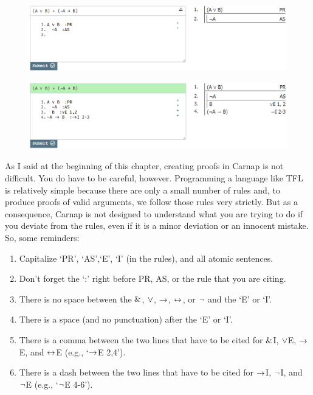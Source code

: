 \begin{figure}[h]
\includegraphics[width=13cm]{textbook--2a.PNG}
\caption{}
\label{fig:proof-2a}
\end{figure}

\begin{figure}[h]
\includegraphics[width=13cm]{textbook--2b.PNG}
\caption{}
\label{fig:proof-2b}
\end{figure}

As I said at the beginning of this chapter, creating proofs in Carnap is not difficult. You do have to be careful, however. Programming a language like TFL is relatively simple because there are only a small number of rules and, to produce proofs of valid arguments, we follow those rules very strictly. But as a consequence, Carnap is not designed to understand what you are trying to do if you deviate from the rules, even if it is a minor deviation or an innocent mistake. So, some reminders:
\begin{enumerate}
\itemsep-.3mm
	\item Capitalize `PR', `AS',`E', `I' (in the rules), and all atomic sentences.
	\item Don't forget the `:' right before PR, AS, or the rule that you are citing. 
	\item There is no space between the $\mathbin{\&}$, $\vee$, $\rightarrow$, $\leftrightarrow$, or ${\neg}$ and the `E' or `I'.  
	\item There is a space (and no punctuation) after the `E' or `I'. 
	\item There is a comma between the two lines that have to be cited for $\mathbin{\&}$I, $\vee$E, $\rightarrow$E, and $\leftrightarrow$E (e.g., `$\rightarrow$E 2,4').
	\item There is a dash between the two lines that have to be cited for $\rightarrow$I, ${\neg}$I, and ${\neg}$E (e.g., `${\neg}$E 4-6').
\end{enumerate}





